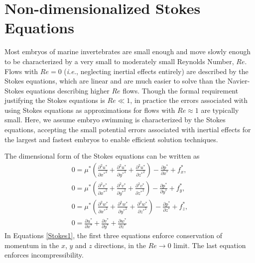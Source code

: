 \documentclass[10pt,a4paper]{article}
\def\non{\nonumber}
\def\p{\partial}
\begin{document}
\section{Non-dimensionalized Stokes Equations}\label{NDStokesSect}
Most embryos of marine invertebrates are small enough and move slowly enough to be characterized by a very small to moderately small Reynolds Number, $Re$. 
Flows with $Re = 0$ (\textit{i.e.}, neglecting inertial effects entirely) are described by the Stokes equations, which are linear and are much easier to solve than the Navier-Stokes equations describing higher $Re$ flows.
Though the formal requirement justifying the Stokes equations is $Re \ll 1$, in practice the errors associated with using Stokes equations as approximations for flows with $Re \approx 1$ are typically small.
Here, we assume embryo swimming is characterized by the Stokes equations, accepting the small potential errors associated with inertial effects for the largest and fastest embryos to enable efficient solution techniques.

The dimensional form of the Stokes equations can be written as
\begin{eqnarray}\label{Stokes1}
	0 = \mu^* \left( \frac{\p^2 u^*}{\p {x^*}^2}+\frac{\p^2 u^*}{\p {y^*}^2}+\frac{\p^2 u^*}{\p {z^*}^2} \right) - \frac{\p p^*}{\p {x^*}} + f_x^*, \non \\
	0 = \mu^* \left( \frac{\p^2 v^*}{\p {x^*}^2}+\frac{\p^2 v^*}{\p {y^*}^2}+\frac{\p^2 v^*}{\p {z^*}^2} \right) - \frac{\p p^*}{\p {y^*}} + f_y^*, \non \\
	0 = \mu^* \left( \frac{\p^2 w^*}{\p {x^*}^2}+\frac{\p^2 w^*}{\p {y^*}^2}+\frac{\p^2 w^*}{\p {z^*}^2} \right) - \frac{\p p^*}{\p {z^*}} + f_z^*, \non \\
	0 =  \frac{\p u^*}{\p {x^*}}+\frac{\p v^*}{\p {y^*}}+\frac{\p w^*}{\p {z^*}} 
\end{eqnarray}
In Equations \ref{Stokes1}, the first three equations enforce conservation of momentum in the $x$, $y$ and $z$ directions, in the $Re \rightarrow 0$ limit.
The last equation enforces incompressibility.
\end{document}
